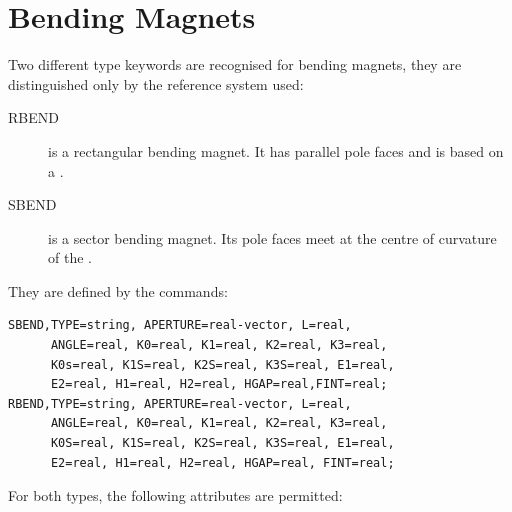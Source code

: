 \section{Bending Magnets}
\label{sec:bend}
Two different type keywords are recognised for bending magnets,
they are distinguished only by the reference system used:
\begin{description}
\item[RBEND] 
  \label{sec:rbend}
  is a rectangular bending magnet.
  It has parallel pole faces and is based on a
  .
\item[SBEND] 
  \label{sec:sbend}
  is a sector bending magnet.
  Its pole faces meet at the centre of curvature of the 
  .
\end{description}
They are defined by the commands:
\begin{verbatim}
SBEND,TYPE=string, APERTURE=real-vector, L=real, 
      ANGLE=real, K0=real, K1=real, K2=real, K3=real, 
      K0s=real, K1S=real, K2S=real, K3S=real, E1=real, 
      E2=real, H1=real, H2=real, HGAP=real,FINT=real;
RBEND,TYPE=string, APERTURE=real-vector, L=real, 
      ANGLE=real, K0=real, K1=real, K2=real, K3=real, 
      K0S=real, K1S=real, K2S=real, K3S=real, E1=real, 
      E2=real, H1=real, H2=real, HGAP=real, FINT=real;
\end{verbatim}
For both types, the following attributes are permitted:
